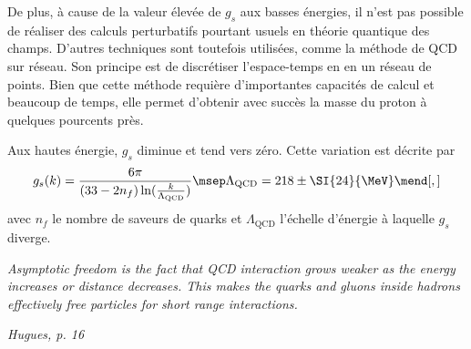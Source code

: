 \par De plus, à cause de la valeur élevée de $g_s$ aux basses énergies, il n'est pas possible de réaliser des calculs perturbatifs pourtant usuels en théorie quantique des champs.
D'autres techniques sont toutefois utilisées, comme la méthode de QCD sur réseau. Son principe est de discrétiser l'espace-temps en en un réseau de points. Bien que cette méthode requière d'importantes capacités de calcul et beaucoup de temps, elle permet d'obtenir avec succès la masse du proton à quelques pourcents près.
\par Aux hautes énergie, $g_s$ diminue et tend vers zéro. Cette variation est décrite par
\begin{equation}
g_s (k) = \frac{6\pi}{(33-2n_f)\ln(\frac{k}{\Lambda_\text{QCD}})}
\msep
\Lambda_\text{QCD} = 218\pm\SI{24}{\MeV}
\mend[,]
\end{equation}
avec $n_f$ le nombre de saveurs de quarks et $\Lambda_\text{QCD}$ l'échelle d'énergie à laquelle $g_s$ diverge.

\emph{Asymptotic freedom is the fact that QCD interaction grows weaker as the energy increases or distance decreases. This makes the quarks and gluons inside hadrons effectively free particles for short range interactions.}

\emph{Hugues, p. 16}


